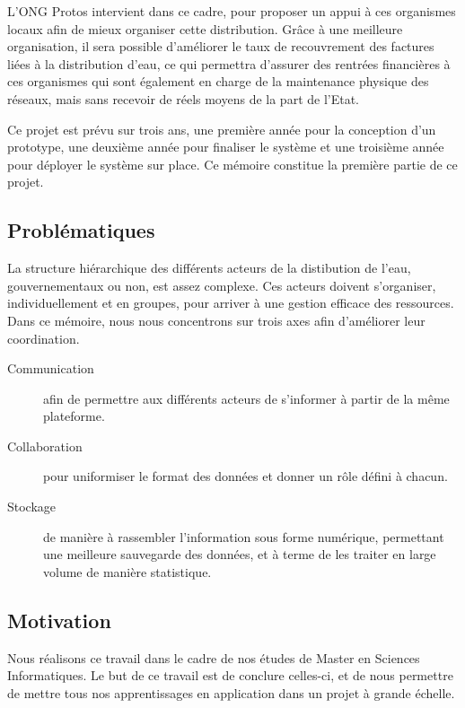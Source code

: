 \documentclass{eplmastersthesis_FR}
\begin{document}
			L'ONG Protos intervient dans ce cadre, pour proposer un appui à ces organismes locaux afin de mieux organiser cette distribution. Grâce à une meilleure organisation, il sera possible d'améliorer le taux de recouvrement des factures liées à la distribution d'eau, ce qui permettra d'assurer des rentrées financières à ces organismes qui sont également en charge de la maintenance physique des réseaux, mais sans recevoir de réels moyens de la part de l'Etat.

			Ce projet est prévu sur trois ans, une première année pour la conception d'un prototype, une deuxième année pour finaliser le système et une troisième année pour déployer le système sur place. Ce mémoire constitue la première partie de ce projet.

		\subsection*{Problématiques}

			La structure hiérarchique des différents acteurs de la distibution de l'eau, gouvernementaux ou non, est assez complexe. Ces acteurs doivent s'organiser, individuellement et en groupes, pour arriver à une gestion efficace des ressources. Dans ce mémoire, nous nous concentrons sur trois axes afin d'améliorer leur coordination.

			\begin{description}
				\item[Communication] afin de permettre aux différents acteurs de s'informer à partir de la même plateforme.
				\item[Collaboration] pour uniformiser le format des données et donner un rôle défini à chacun.
				\item[Stockage] de manière à rassembler l'information sous forme numérique, permettant une meilleure sauvegarde des données, et à terme de les traiter en large volume de manière statistique.
			\end{description}

		\subsection*{Motivation}

			Nous réalisons ce travail dans le cadre de nos études de Master en Sciences Informatiques. Le but de ce travail est de conclure celles-ci, et de nous permettre de mettre tous nos apprentissages en application dans un projet à grande échelle.
\end{document}
